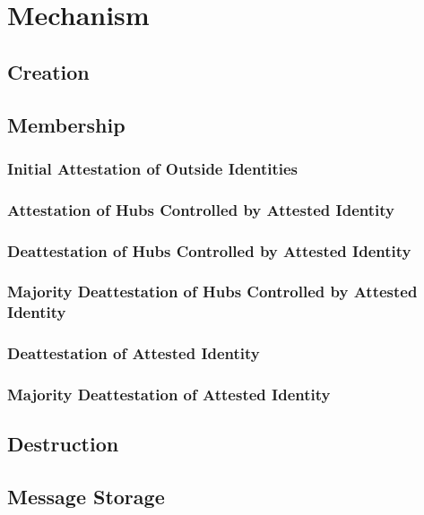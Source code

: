 \section{Mechanism}

\subsection{Creation}

\subsection{Membership}

\subsubsection{Initial Attestation of Outside Identities}

\subsubsection{Attestation of Hubs Controlled by Attested Identity}

\subsubsection{Deattestation of Hubs Controlled by Attested Identity}

\subsubsection{Majority Deattestation of Hubs Controlled by Attested Identity}

\subsubsection{Deattestation of Attested Identity}

\subsubsection{Majority Deattestation of Attested Identity}

\subsection{Destruction}

\subsection{Message Storage}

